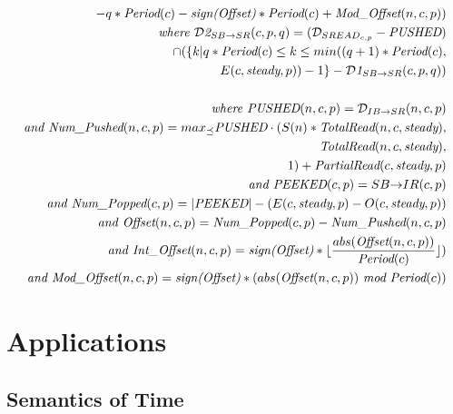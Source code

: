 \begin{itemize}
\begin{align*}
                   - q * \mt{Period}(c) 
                   - \mt{sign(Offset)} * \mt{Period}(c) + \mt{Mod\_Offset}(n,c,p)) \\
\mt{where }{{\cal D}\mt{2}}_{SB {\small \rightarrow} SR}(c,p,q) = 
  ({\cal D}_{{SREAD}_{c, p}} - \mt{PUSHED}) \\
                         \cap ( \{ k | q * \mt{Period}(c)
                                      \le k 
                                      \le min((q+1)*\mt{Period}(c),  \\
                                              E(c, \mt{steady}, p)) - 1 \} - {{\cal D}\mt{1}}_{SB {\small \rightarrow} SR}(c,p,q) ) \\ ~ \\
%
%
\mt{where }\mt{PUSHED}(n,c,p) = {\cal D}_{IB {\small \rightarrow} SR}(n,c,p) \\
\mt{and }\mt{Num\_Pushed}(n,c,p) = 
  max_{\preceq}\mt{PUSHED} \cdot (S(n) * \mt{TotalRead}(n,c,\mt{steady}), \\
                                        \mt{TotalRead}(n,c,\mt{steady}), \\
                                        1 ) + \mt{PartialRead}(c, \mt{steady}, p) \\
\mt{and }\mt{PEEKED}(c,p) = {SB {\small \rightarrow} IR}(c,p) \\
\mt{and }\mt{Num\_Popped}(c,p) = |\mt{PEEKED}| - (E(c,\mt{steady},p) - O(c,\mt{steady},p)) \\
\mt{and }\mt{Offset}(n,c,p) = \mt{Num\_Popped}(c,p)-\mt{Num\_Pushed}(n,c,p) \\
\mt{and }\mt{Int\_Offset}(n,c,p) = \mt{sign(Offset)}*\lfloor \frac{abs(\mt{Offset}(n,c,p))}{\mt{Period}(c)} \rfloor) \\
\mt{and }\mt{Mod\_Offset}(n,c,p) = \mt{sign(Offset)}*(abs(\mt{Offset}(n,c,p))~\mt{mod}~\mt{Period}(c)) \\
%
\end{align*}
%
\end{itemize}

\section{Applications}

\subsection{Semantics of Time}

\noindent {\bf \dep}

